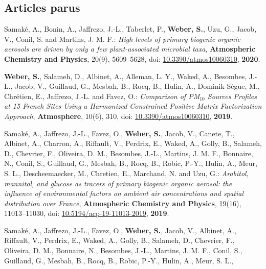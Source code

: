 

\subsection{Articles parus}

\begin{etaremune}
    \item Samaké, A., Bonin, A., Jaffrezo, J.-L., Taberlet, P., \textbf{Weber, S.}, Uzu,
        G., Jacob, V., Conil, S. and Martins, J. M. F.:
        \textit{High levels of primary biogenic organic aerosols are driven by only a few
            plant-associated microbial taxa}, 
        \textbf{Atmospheric Chemistry and Physics}, 20(9), 5609–5628,
        doi: \href{https://doi.org/10.5194/acp-20-5609-2020}{10.3390/atmos10060310},
        \textbf{2020}.
    \item \textbf{Weber, S.}, Salameh, D., Albinet, A., Alleman, L. Y., Waked, A.,
        Besombes, J.-L., Jacob, V., Guillaud, G., Mesbah, B., Rocq, B., Hulin, A.,
        Dominik-Sègue, M., Chrétien, E., Jaffrezo, J.-L. and Favez, O.:
        \textit{Comparison of PM$_{10}$ Sources Profiles at 15 French Sites Using a Harmonized Constrained Positive
        Matrix Factorization Approach}, \textbf{Atmosphere}, 10(6), 310,
        doi: \href{https://doi.org/10.3390/atmos10060310}{10.3390/atmos10060310},
        \textbf{2019}.
    \item Samaké, A., Jaffrezo, J.-L., Favez, O., \textbf{Weber, S.}, Jacob, V., Canete,
        T., Albinet, A., Charron, A., Riffault, V., Perdrix, E., Waked, A., Golly, B.,
        Salameh, D., Chevrier, F., Oliveira, D. M., Besombes, J.-L., Martins, J. M. F.,
        Bonnaire, N., Conil, S., Guillaud, G., Mesbah, B., Rocq, B., Robic, P.-Y., Hulin,
        A., Meur, S. L., Descheemaecker, M., Chretien, E., Marchand, N. and Uzu, G.:
        \textit{Arabitol, mannitol, and glucose as tracers of primary biogenic organic
            aerosol: the influence of environmental factors on ambient air concentrations
            and spatial distribution over France},
        \textbf{Atmospheric Chemistry and Physics}, 19(16), 11013–11030,
        doi: \href{https://doi.org/10.5194/acp-19-11013-2019}{10.5194/acp-19-11013-2019},
        \textbf{2019}.
    \item Samaké, A., Jaffrezo, J.-L., Favez, O., \textbf{Weber, S.}, Jacob, V., Albinet,
        A., Riffault, V., Perdrix, E., Waked, A., Golly, B., Salameh, D., Chevrier, F.,
        Oliveira, D. M., Bonnaire, N., Besombes, J.-L., Martins, J. M.  F., Conil, S.,
        Guillaud, G., Mesbah, B., Rocq, B., Robic, P.-Y., Hulin, A., Meur, S. L.,

\end{etaremune}
